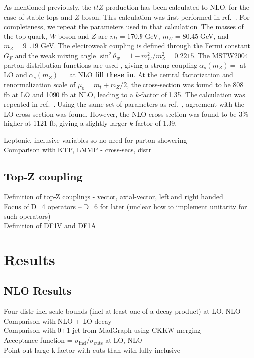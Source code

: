 \documentclass[preprint]{JHEP3} %
\def\ttbZ{t\bar{t}Z}
\begin{document}
As mentioned previously, the $\ttbZ$ production has been calculated to NLO, for the case of stable tops and $Z$ boson. This calculation was first performed in ref.~\cite{Lazopoulos:2008de}. For completeness, we repeat the parameters used in that calculation. The masses of the top quark, $W$ boson and $Z$ are $m_t=170.9$ GeV, $m_W=80.45$ GeV, and $m_Z=91.19$ GeV. The electroweak coupling is defined through the Fermi constant $G_F$ and the weak mixing angle $\sin^2\theta_w = 1-m_W^2/m_Z^2 =0.2215$. The MSTW2004 parton distribution functions are used \cite{}, giving a strong coupling $\alpha_s(m_Z)=$ at LO and $\alpha_s(m_Z)=$ at NLO {\bf fill these in}. At the central factorization and renormalization scale of $\mu_0=m_t+m_Z/2$, the cross-section was found to be 808 fb at LO and 1090 fb at NLO, leading to a $k$-factor of 1.35. The calculation was repeated in ref.~\cite{Kardos:2011na}.  Using the same set of parameters as ref.~\cite{Lazopoulos:2008de}, agreement with the LO cross-section was found. However, the NLO cross-section was found to be 3\% higher at 1121 fb, giving a slightly larger $k$-factor of 1.39. 






Leptonic, inclusive variables so no need for parton showering \\
Comparison with KTP, LMMP - cross-secs, distr \\

\subsection{Top-Z coupling}
Definition of top-Z couplings - vector, axial-vector, left and right handed \\
Focus of D=4 operators -- D=6 for later (unclear how to implement unitarity for such operators) \\
Definition of DF1V and DF1A

\section{Results}
\subsection{NLO Results}
Four distr incl scale bounds (incl at least one of a decay product) at LO, NLO\\
Comparison with NLO + LO decay \\
Comparison with 0+1 jet from MadGraph using CKKW merging \\
Acceptance function = $\sigma_{\mathrm{incl}} / \sigma_{\mathrm{cuts}}$ at LO, NLO\\
Point out large k-factor with cuts than with fully inclusive \\
\end{document}
